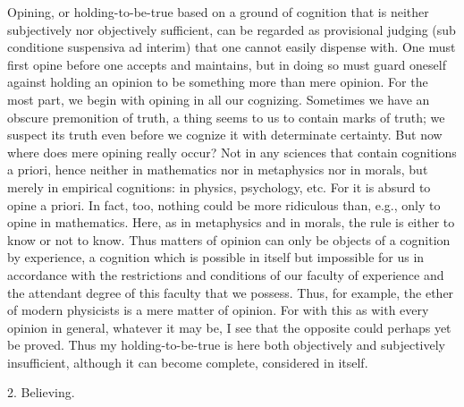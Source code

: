 Opining, or holding-to-be-true based on a ground of cognition
that is neither subjectively nor objectively sufficient, can be regarded
as provisional judging (sub conditione suspensiva ad interim) that
one cannot easily dispense with.
One must first opine before one accepts and maintains,
but in doing so must guard oneself against holding an opinion to be
something more than mere opinion.
For the most part, we begin with
opining in all our cognizing. Sometimes we have an obscure premonition
of truth, a thing seems to us to contain marks of truth; we suspect its truth
even before we cognize it with determinate certainty.
But now where does mere opining really occur?
Not in any sciences that contain cognitions a priori,
hence neither in mathematics nor in metaphysics nor in morals,
but merely in empirical cognitions: in physics, psychology, etc.
For it is absurd to opine a priori.
In fact, too, nothing could be more ridiculous than, e.g.,
only to opine in mathematics.
Here, as in metaphysics and in morals,
the rule is either to know or not to know.
Thus matters of opinion can only be objects of a cognition by experience,
a cognition which is possible in itself but impossible for us in accordance
with the restrictions and conditions of our faculty of experience and the
attendant degree of this faculty that we possess.
Thus, for example, the ether of modern physicists is a mere matter of opinion.
For with this as with every opinion in general, whatever it may be,
I see that the opposite could perhaps yet be proved.
Thus my holding-to-be-true is here both objectively and subjectively insufficient,
although it can become complete, considered in itself.

2. Believing.

